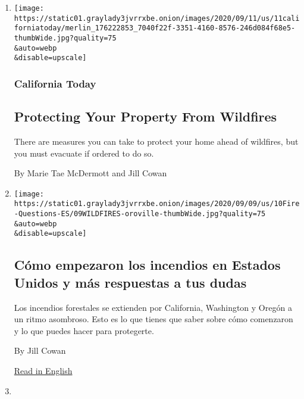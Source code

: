 \begin{enumerate}
\def\labelenumi{\arabic{enumi}.}
\item
  \href{/2020/09/11/us/how-to-protect-property-from-wildfires.html}{}

  \texttt{[image: https://static01.graylady3jvrrxbe.onion/images/2020/09/11/us/11californiatoday/merlin\_176222853\_7040f22f-3351-4160-8576-246d084f68e5-thumbWide.jpg?quality=75\\\&auto=webp\\\&disable=upscale]}

  \hypertarget{california-today}{%
  \subsubsection{California Today}\label{california-today}}

  \hypertarget{protecting-your-property-from-wildfires}{%
  \subsection{Protecting Your Property From
  Wildfires}\label{protecting-your-property-from-wildfires}}

  There are measures you can take to protect your home ahead of
  wildfires, but you must evacuate if ordered to do so.

  By Marie Tae McDermott and Jill Cowan
\item
  \href{/es/2020/09/10/espanol/estados-unidos/incendios-california-oregon-washington.html}{}

  \texttt{[image: https://static01.graylady3jvrrxbe.onion/images/2020/09/09/us/10Fire-Questions-ES/09WILDFIRES-oroville-thumbWide.jpg?quality=75\\\&auto=webp\\\&disable=upscale]}

  \hypertarget{cuxf3mo-empezaron-los-incendios-en-estados-unidos-y-muxe1s-respuestas-a-tus-dudas}{%
  \subsection{Cómo empezaron los incendios en Estados Unidos y más
  respuestas a tus
  dudas}\label{cuxf3mo-empezaron-los-incendios-en-estados-unidos-y-muxe1s-respuestas-a-tus-dudas}}

  Los incendios forestales se extienden por California, Washington y
  Oregón a un ritmo asombroso. Esto es lo que tienes que saber sobre
  cómo comenzaron y lo que puedes hacer para protegerte.

  By Jill Cowan

  \href{https://www.nytimes3xbfgragh.onion/article/wildfires-california-oregon-washington.html}{Read
  in English}
\item
  \href{/2020/09/10/us/california-wildfires.html}{}


\end{enumerate}
